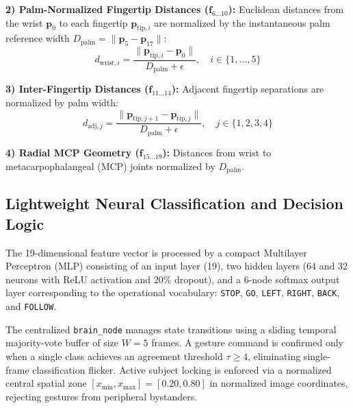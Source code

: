 \documentclass[conference]{IEEEtran}
\begin{document}
\textbf{2) Palm-Normalized Fingertip Distances ($\mathbf{f}_{6\dots10}$):} Euclidean distances from the wrist $\mathbf{p}_0$ to each fingertip $\mathbf{p}_{\text{tip}, i}$ are normalized by the instantaneous palm reference width $D_{\text{palm}} = \|\mathbf{p}_5 - \mathbf{p}_{17}\|$:
\begin{equation}
d_{\text{wrist}, i} = \frac{\|\mathbf{p}_{\text{tip}, i} - \mathbf{p}_0\|}{D_{\text{palm}} + \epsilon}, \quad i \in \{1,\dots,5\}
\end{equation}

\textbf{3) Inter-Fingertip Distances ($\mathbf{f}_{11\dots14}$):} Adjacent fingertip separations are normalized by palm width:
\begin{equation}
d_{\text{adj}, j} = \frac{\|\mathbf{p}_{\text{tip}, j+1} - \mathbf{p}_{\text{tip}, j}\|}{D_{\text{palm}} + \epsilon}, \quad j \in \{1, 2, 3, 4\}
\end{equation}

\textbf{4) Radial MCP Geometry ($\mathbf{f}_{15\dots19}$):} Distances from wrist to metacarpophalangeal (MCP) joints normalized by $D_{\text{palm}}$.

\subsection{Lightweight Neural Classification and Decision Logic}
The 19-dimensional feature vector is processed by a compact Multilayer Perceptron (MLP) consisting of an input layer (19), two hidden layers (64 and 32 neurons with ReLU activation and 20\% dropout), and a 6-node softmax output layer corresponding to the operational vocabulary: \texttt{STOP}, \texttt{GO}, \texttt{LEFT}, \texttt{RIGHT}, \texttt{BACK}, and \texttt{FOLLOW}. 

The centralized \texttt{brain\_node} manages state transitions using a sliding temporal majority-vote buffer of size $W=5$ frames. A gesture command is confirmed only when a single class achieves an agreement threshold $\tau \ge 4$, eliminating single-frame classification flicker. Active subject locking is enforced via a normalized central spatial zone $[x_{\min}, x_{\max}] = [0.20, 0.80]$ in normalized image coordinates, rejecting gestures from peripheral bystanders.
\end{document}

